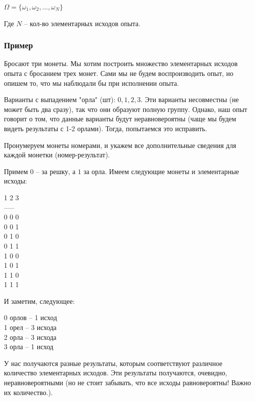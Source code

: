 \documentclass{article}
\begin{document}
$\Omega = \{\omega_1, \omega_2, ..., \omega_N\}$

Где $N$ -- кол-во элементарных исходов опыта.

\subsubsection{Пример}

Бросают три монеты.
Мы хотим построить множество элементарных исходов опыта с бросанием трех монет.
Сами мы не будем воспроизводить опыт, но опишем то, что мы наблюдали бы при исполнении опыта.

Варианты с выпадением "орла" (шт): $0 , 1 , 2 , 3$. Эти варианты несовместны (не может быть два сразу), так что они образуют полную группу. Однако, наш опыт говорит о том, что данные варианты будут неравновероятны (чаще мы будем видеть результаты с 1-2 орлами). Тогда, попытаемся это исправить.

Пронумеруем монеты номерами, и укажем все дополнительные сведения для каждой монетки (номер-результат).

Примем $0$ -- за решку, а $1$ за орла. Имеем следующие монеты и элементарные исходы:

\begin{center}
1 2 3\\
-----\\
0 0 0\\
0 0 1\\
0 1 0\\
0 1 1\\
1 0 0\\
1 0 1\\
1 1 0\\
1 1 1\\
\end{center}

И заметим, следующее:

\begin{center}
0 орлов -- 1 исход\\
1 орел -- 3 исхода\\
2 орла -- 3 исхода\\
3 орла -- 1 исход\\
\end{center}

У нас получаются разные результаты, которым соответствуют различное количество элементарных исходов. Эти результаты получаются, очевидно, неравновероятными (но не стоит забывать, что все исходы равновероятны! Важно их количество.).
\end{document}
